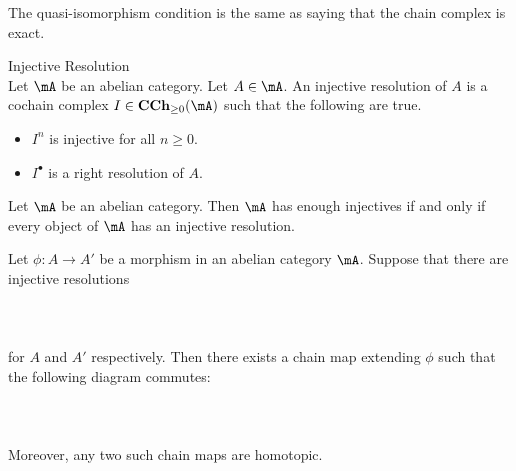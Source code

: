 \documentclass[a4paper]{article}
\begin{document}
The quasi-isomorphism condition is the same as saying that the chain complex is exact. 

\begin{defn}{Injective Resolution}{}\\
Let $\mA$ be an abelian category. Let $A\in\mA$. An injective resolution of $A$ is a cochain complex $I\in\bold{CCh}_{\geq 0}(\mA)$ such that the following are true. 
\begin{itemize}
\item $I^n$ is injective for all $n\geq 0$. 
\item $I^\bullet$ is a right resolution of $A$. 
\end{itemize}
\end{defn}

\begin{prp}{}{} Let $\mA$ be an abelian category. Then $\mA$ has enough injectives if and only if every object of $\mA$ has an injective resolution. 
\end{prp}

\begin{prp}{}{} Let $\phi:A\to A'$ be a morphism in an abelian category $\mA$. Suppose that there are injective resolutions \\~\\
\\~\\
for $A$ and $A'$ respectively. Then there exists a chain map extending $\phi$ such that the following diagram commutes: \\~\\
\\~\\
Moreover, any two such chain maps are homotopic. 
\end{prp}
\end{document}
